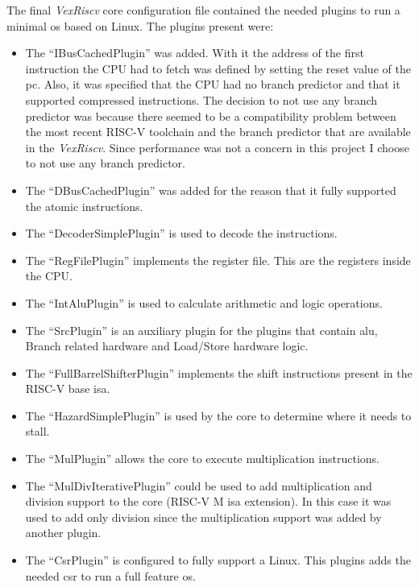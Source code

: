 The final \textit{VexRiscv} core configuration file contained the needed plugins to run a minimal \acrfull{os} based on Linux. The plugins present were:
\begin{itemize}
  \item The \enquote{IBusCachedPlugin} was added. With it the address of the first instruction the CPU had to fetch was defined by setting the reset value of the \acrfull{pc}. Also, it was specified that the CPU had no branch predictor and that it supported compressed instructions. The decision to not use any branch predictor was because there seemed to be a compatibility problem between the most recent RISC-V toolchain and the branch predictor that are available in the \textit{VexRiscv}. Since performance was not a concern in this project I choose to not use any branch predictor.
  \item The \enquote{DBusCachedPlugin} was added for the reason that it fully supported the atomic instructions.
  \item The \enquote{DecoderSimplePlugin} is used to decode the instructions.
  \item The \enquote{RegFilePlugin} implements the register file. This are the registers inside the CPU.
  \item The \enquote{IntAluPlugin} is used to calculate arithmetic and logic operations.
  \item The \enquote{SrcPlugin} is an auxiliary plugin for the plugins that contain \acrfull{alu}, Branch related hardware and Load/Store hardware logic.
  \item The \enquote{FullBarrelShifterPlugin} implements the shift instructions present in the RISC-V base \acrfull{isa}.
  \item The \enquote{HazardSimplePlugin} is used by the core to determine where it needs to stall.
  \item The \enquote{MulPlugin} allows the core to execute multiplication instructions.
  \item The \enquote{MulDivIterativePlugin} could be used to add multiplication and division support to the core (RISC-V M \acrshort{isa} extension). In this case it was used to add only division since the multiplication support was added by another plugin.
  \item The \enquote{CsrPlugin} is configured to fully support a Linux. This plugins adds the needed \acrfull{csr} to run a full feature \acrshort{os}. 

\end{itemize}
